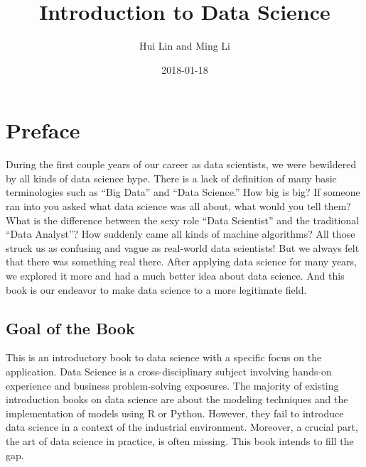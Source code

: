 \documentclass[12pt,]{krantz}
\title{Introduction to Data Science}
\author{Hui Lin and Ming Li}
\date{2018-01-18}
\theoremstyle{definition}
\theoremstyle{definition}
\theoremstyle{remark}
\begin{document}
\maketitle

\thispagestyle{empty}
\begin{center}
\end{center}

\setlength{\abovedisplayskip}{-5pt}
\setlength{\abovedisplayshortskip}{-5pt}

{
\hypersetup{linkcolor=black}
\setcounter{tocdepth}{2}
\tableofcontents
}
\listoftables
\listoffigures
\chapter*{Preface}\label{preface}


During the first couple years of our career as data scientists, we were
bewildered by all kinds of data science hype. There is a lack of
definition of many basic terminologies such as ``Big Data'' and ``Data
Science.'' How big is big? If someone ran into you asked what data
science was all about, what would you tell them? What is the difference
between the sexy role ``Data Scientist'' and the traditional ``Data
Analyst''? How suddenly came all kinds of machine algorithms? All those
struck us as confusing and vague as real-world data scientists! But we
always felt that there was something real there. After applying data
science for many years, we explored it more and had a much better idea
about data science. And this book is our endeavor to make data science
to a more legitimate field.

\section*{Goal of the Book}\label{goal-of-the-book}


This is an introductory book to data science with a specific focus on
the application. Data Science is a cross-disciplinary subject involving
hands-on experience and business problem-solving exposures. The majority
of existing introduction books on data science are about the modeling
techniques and the implementation of models using R or Python. However,
they fail to introduce data science in a context of the industrial
environment. Moreover, a crucial part, the art of data science in
practice, is often missing. This book intends to fill the gap.
\end{document}
